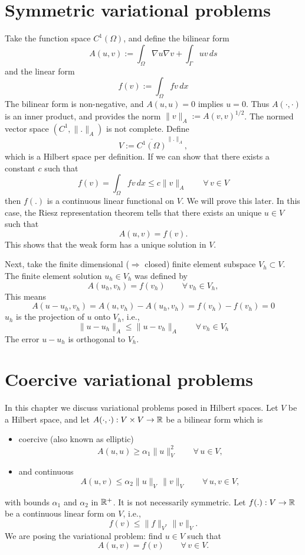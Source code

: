 \section{Symmetric variational problems}
Take the function space $C^1(\Omega)$, and define the bilinear form
$$
A(u,v) := \int_\Omega \nabla u \nabla v + \int_\Gamma u v \, ds
$$
and the linear form
$$
f(v) := \int_\Omega f v \, dx
$$
The bilinear form is non-negative, and $A(u,u) = 0$ implies $u = 0$.
Thus $A(\cdot,\cdot)$ is an inner product, and provides the
norm $\|v\|_A := A(v,v)^{1/2}$. The normed vector space $(C^1, \|.\|_A)$
is not complete. Define
$$
V := \overline{C^1(\Omega)}^{\|.\|_A},
$$
which is a Hilbert space per definition. If we can show that there exists
a constant $c$ such that
$$
f(v) = \int_\Omega f v \, dx \leq c \| v \|_A \qquad \forall \, v \in V
$$
then $f(.)$ is a continuous linear functional on $V$.
We will prove this later. In this case, the Riesz representation theorem 
tells that there exists an unique $u \in V$ such that
$$
A(u,v) = f(v).
$$
This shows that the weak form has a unique solution in $V$.

Next, take the finite dimensional ($\Rightarrow$ closed) finite element subspace $V_h \subset V$.
The finite element solution $u_h \in V_h$ was defined by
$$
A(u_h,v_h) = f(v_h) \qquad \forall \, v_h \in V_h,
$$
This means
$$
A(u-u_h, v_h) = A(u,v_h) - A(u_h,v_h) = f(v_h) - f(v_h) = 0
$$
$u_h$ is the projection of $u$ onto $V_h$, i.e.,
$$
\| u - u_h \|_A \leq \| u - v_h \|_A \qquad \forall \, v_h \in V_h
$$
The error $u - u_h$ is orthogonal to $V_h$.

\section{Coercive variational problems}
%
In this chapter we discuss variational problems posed in Hilbert spaces.
Let $V$ be a Hilbert space, and let $A(\cdot,\cdot) : V \times V \rightarrow {\mathbb R}$ be
a bilinear form which is
\begin{itemize}
\item coercive (also known as elliptic)
\begin{equation}
A(u,u) \geq \alpha_1 \| u \|_V^2 \qquad \forall \, u \in V,
\end{equation}
\item and continuous
\begin{equation}
A(u,v) \leq \alpha_2 \| u \|_V  \, \| v \|_V \qquad \forall \, u , v \in V,
\end{equation}
\end{itemize}
with bounds $\alpha_1$ and $\alpha_2$ in ${\mathbb R}^+$. It is not necessarily symmetric.
Let $f(.) : V \rightarrow {\mathbb R}$ be a continuous linear form on $V$, i.e., 
$$
f(v) \leq \| f \|_{V^\ast} \| v \|_V.
$$
We are posing the variational problem: find $u \in V$ such that
$$
A(u,v) = f(v) \qquad \forall \, v \in V.
$$

